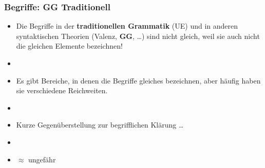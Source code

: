 \begin{frame}
\frametitle{Begriffe: GG \vs Traditionell}

\begin{itemize}
	\item Die Begriffe in der \textbf{traditionellen Grammatik} (UE) und in anderen syntaktischen Theorien (Valenz, \textbf{GG}, \dots ) sind nicht gleich, weil sie auch nicht die gleichen Elemente bezeichnen!
	\item[]
	\item Es gibt Bereiche, in denen die Begriffe gleiches bezeichnen, aber häufig haben sie verschiedene Reichweiten.
	\item[]
	\item Kurze Gegenüberstellung zur begrifflichen Klärung \dots
	\item[]
	\item $\approx$ \ras ungefähr
\end{itemize}

\end{frame}


